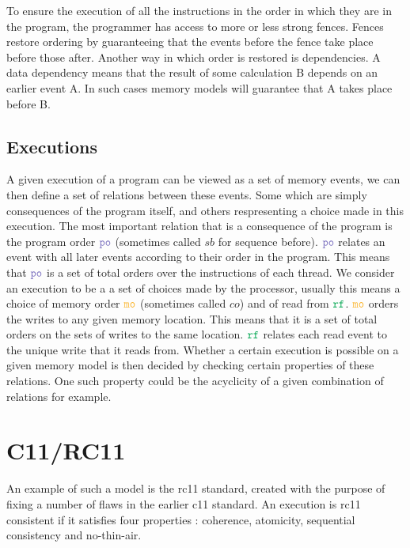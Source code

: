 \documentclass[a4,11pt]{article}
\newcommand{\mo}{\texttt{\color{Dandelion}mo}}
\newcommand{\po}{\texttt{\color{Periwinkle}po}}
\newcommand{\rf}{\texttt{\color{Green}rf}}
\begin{document}
To ensure the execution of all the instructions in the order in which they are in the program, the programmer has access to more or less strong fences. Fences restore ordering by guaranteeing that the events before the fence take place before those after. Another way in which order is restored is dependencies. A data dependency means that the result of some calculation B depends on an earlier event A. In such cases memory models will guarantee that A takes place before B.%

\subsection{Executions}

A given execution of a program can be viewed as a set of memory events, we can then define a set of relations between these events. Some which are simply consequences of the program itself, and others respresenting a choice made in this execution. The most important relation that is a consequence of the program is the program order $\po$ (sometimes called $sb$ for sequence before). $\po$ relates an event with all later events according to their order in the program. This means that $\po$ is a set of total orders over the instructions of each thread. We consider an execution to be a a set of choices made by the processor, usually this means a choice of memory order $\mo$ (sometimes called $co$) and of read from $\rf$. $\mo$ orders the writes to any given memory location. This means that it is a set of total orders on the sets of writes to the same location. $\rf$ relates each read event to the unique write that it reads from. Whether a certain execution is possible on a given memory model is then decided by checking certain properties of these relations. One such property could be the acyclicity of a given combination of relations for example.

\vfill

\section{C11/RC11}

An example of such a model is the rc11 standard, created with the purpose of fixing a number of flaws in the earlier c11 standard. An execution is rc11 consistent if it satisfies four properties : coherence, atomicity, sequential consistency and no-thin-air. 
\end{document}
